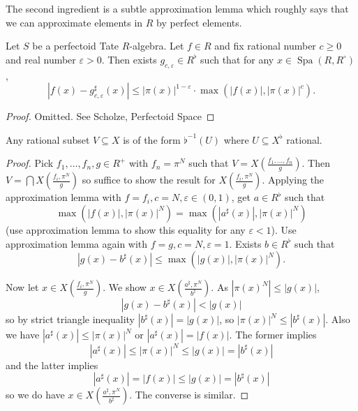 \documentclass[a4paper]{article}
\newcommand{\tilt}{\flat} %
\DeclareMathOperator{\Spa}{Spa}
\DeclareMathOperator{\Spa}{Spa}
\begin{document}
The second ingredient is a subtle approximation lemma which roughly says that we can approximate elements in \(R\) by perfect elements.

\begin{proposition}
  Let \(S\) be a perfectoid Tate \(R\)-algebra. Let \(f \in R\) and fix rational number \(c \geq 0\) and real number \(\varepsilon > 0\). Then exists \(g_{c, \varepsilon} \in R^\tilt\) such that for any \(x \in \Spa(R, R^\circ)\),
  \[
    |f(x) - g_{c, \varepsilon}^\sharp(x)| \leq |\pi(x)|^{1 - \varepsilon} \cdot \max(|f(x)|, |\pi(x)|^c).
  \]
\end{proposition}

\begin{proof}
  Omitted. See Scholze, Perfectoid Space
\end{proof}

\begin{corollary}
  Any rational subset \(V \subseteq X\) is of the form \(\tilt^{-1}(U)\) where \(U \subseteq X^\tilt\) rational.
\end{corollary}

\begin{proof}
  Pick \(f_1, \dots, f_n, g \in R^+\) with \(f_n = \pi^N\) such that \(V = X(\frac{f_1, \dots, f_n}{g})\). Then \(V = \bigcap X(\frac{f_i, \pi^N}{g})\) so suffice to show the result for \(X(\frac{f_i, \pi^N}{g})\). Applying the approximation lemma with \(f = f_i, c = N, \varepsilon \in (0, 1)\), get \(a \in R^\tilt\) such that
  \[
    \max(|f(x)|, |\pi(x)|^N) = \max(|a^\sharp(x)|, |\pi(x)|^N)
  \]
  (use approximation lemma to show this equality for any \(\varepsilon < 1\)). Use approximation lemma again with \(f = g, c = N, \varepsilon = 1\). Exists \(b \in R^\tilt\) such that
  \[
    |g(x) - b^\sharp(x)| \leq \max (|g(x)|, |\pi(x)|^N).
  \]

  Now let \(x \in X(\frac{f_i, \pi^N}{g})\). We show \(x \in X(\frac{a^\sharp, \pi^N}{b^\sharp})\). As \(|\pi(x)^N| \leq |g(x)|\),
  \[
    |g(x) - b^\sharp(x)| < |g(x)|
  \]
  so by strict triangle inequality \(|b^\sharp(x)| = |g(x)|\), so \(|\pi(x)|^N \leq |b^\sharp(x)|\). Also we have \(|a^\sharp(x)| \leq |\pi(x)|^N\) or \(|a^\sharp(x)| = |f(x)|\). The former implies
  \[
    |a^\sharp(x)| \leq |\pi(x)|^N \leq |g(x)| = |b^\sharp(x)|
  \]
  and the latter implies
  \[
    |a^\sharp(x)| = |f(x)| \leq |g(x)| = |b^\sharp(x)|
  \]
  so we do have \(x \in X(\frac{a^\sharp, \pi^N}{b^\sharp})\). The converse is similar.
\end{proof}
\end{document}
